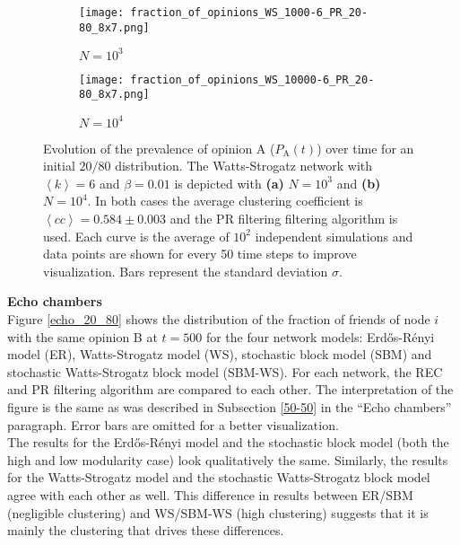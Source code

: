 \documentclass[11 pt , letterpaper , twoside , openright]{book}
\begin{document}
\begin{figure}[H]
  \begin{subfigure}[b]{0.49\textwidth}
    \caption{$N = 10^3$}
  	\texttt{[image: fraction\_of\_opinions\_WS\_1000-6\_PR\_20-80\_8x7.png]}
    \label{ws1000}
  \end{subfigure}
  \begin{subfigure}[b]{0.49\textwidth}
    \caption{$N = 10^4$}
  	\texttt{[image: fraction\_of\_opinions\_WS\_10000-6\_PR\_20-80\_8x7.png]}
    \label{ws10000}
  \end{subfigure}
  \captionsetup{format=plain}
  \caption[Evolution of the prevalence of opinion A ($P_\text{A}(t)$) over time for an initial $20/80$ opinion distribution for a WS model with $N=10^3$ or $N=10^4$, $\left<k\right>=6$ and $\beta = 0.01$. The PR filtering algorithm is used.]{Evolution of the prevalence of opinion A ($P_\text{A}(t)$) over time for an initial $20/80$ distribution. The Watts-Strogatz network with $\left<k\right> = 6$ and $\beta = 0.01$ is depicted with \textbf{(a)} $N=10^3$ and \textbf{(b)} $N=10^4$. In both cases the average clustering coefficient is $\left<cc\right> = 0.584 \pm 0.003$ and the PR filtering filtering algorithm is used. Each curve is the average of $10^2$ independent simulations and data points are shown for every 50 time steps to improve visualization. Bars represent the standard deviation $\sigma$.}
\label{ev_op_WS_k=6}
\end{figure}
\noindent
\textbf{Echo chambers}\\
\newline
Figure \ref{echo_20_80} shows the distribution of the fraction of friends of node $i$ with the same opinion B at $t=500$ for the four network models: Erd\H{o}s-R\'{e}nyi model (ER), Watts-Strogatz model (WS), stochastic block model (SBM) and stochastic Watts-Strogatz block model (SBM-WS). For each network, the REC and PR filtering algorithm are compared to each other. The interpretation of the figure is the same as was described in Subsection \ref{50-50} in the ``Echo chambers'' paragraph. Error bars are omitted for a better visualization.\\
\newline
The results for the Erd\H{o}s-R\'{e}nyi model and the stochastic block model (both the high and low modularity case) look qualitatively the same. Similarly, the results for the Watts-Strogatz model and the stochastic Watts-Strogatz block model agree with each other as well. This difference in results between ER/SBM (negligible clustering) and WS/SBM-WS (high clustering) suggests that it is mainly the clustering that drives these differences.\\
\end{document}
